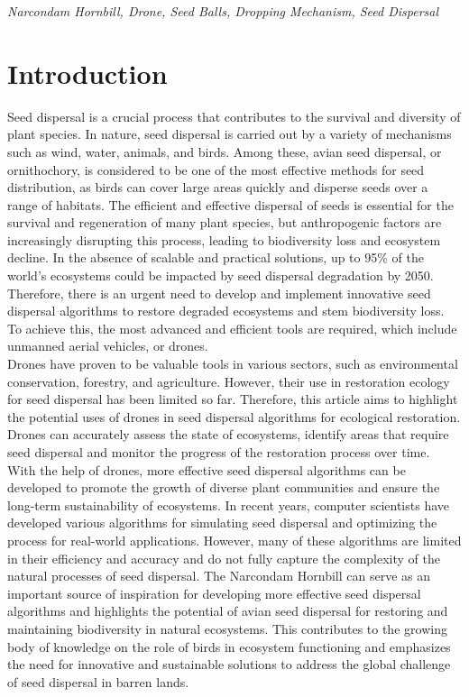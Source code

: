 \documentclass[conference]{IEEEtran}
\begin{document}
\begin{IEEEkeywords}
\textit{Narcondam Hornbill, Drone, Seed Balls, Dropping Mechanism, Seed Dispersal}
\end{IEEEkeywords}

\section{Introduction}
Seed dispersal is a crucial process that contributes to the survival and diversity of plant species. In nature, seed dispersal is carried out by a variety of mechanisms such as wind, water, animals, and birds. Among these, avian seed dispersal, or ornithochory, is considered to be one of the most effective methods for seed distribution, as birds can cover large areas quickly and disperse seeds over a range of habitats. The efficient and effective dispersal of seeds is essential for the survival and regeneration of many plant species, but anthropogenic factors are increasingly disrupting this process, leading to biodiversity loss and ecosystem decline. In the absence of scalable and practical solutions, up to 95\% of the world's ecosystems could be impacted by seed dispersal degradation by 2050. Therefore, there is an urgent need to develop and implement innovative seed dispersal algorithms to restore degraded ecosystems\cite{1,11} and stem biodiversity loss. To achieve this, the most advanced and efficient tools are required, which include unmanned aerial vehicles, or drones. 
\\Drones have proven to be valuable tools in various sectors, such as environmental conservation, forestry, and agriculture\cite{2,10}. However, their use in restoration ecology for seed dispersal has been limited so far. Therefore, this article aims to highlight the potential uses of drones in seed dispersal algorithms for ecological restoration. Drones can accurately assess the state of ecosystems, identify areas that require seed dispersal and monitor the progress of the restoration process over time\cite{3,12}. With the help of drones, more effective seed dispersal algorithms can be developed to promote the growth of diverse plant communities and ensure the long-term sustainability of ecosystems. In recent years, computer scientists have developed various algorithms for simulating seed dispersal and optimizing the process for real-world applications. However, many of these algorithms are limited in their efficiency and accuracy and do not fully capture the complexity of the natural processes of seed dispersal. The Narcondam Hornbill can serve as an important source of inspiration for developing more effective seed dispersal algorithms and highlights the potential of avian seed dispersal for restoring and maintaining biodiversity in natural ecosystems. This contributes to the growing body of knowledge on the role of birds in ecosystem functioning and emphasizes the need for innovative and sustainable solutions to address the global challenge of seed dispersal in barren lands.
\end{document}
